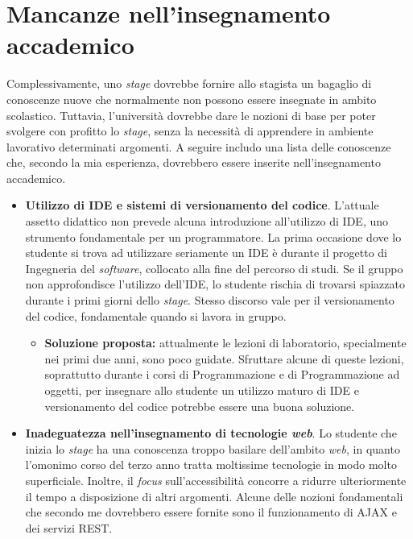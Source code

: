 \section{Mancanze nell'insegnamento accademico}
	Complessivamente, uno \textit{stage} dovrebbe fornire allo stagista un bagaglio di conoscenze nuove che normalmente non possono essere insegnate in ambito scolastico. Tuttavia, l'università dovrebbe dare le nozioni di base per poter svolgere con profitto lo \textit{stage}, senza la necessità di apprendere in ambiente lavorativo determinati argomenti. A seguire includo una lista delle conoscenze che, secondo la mia esperienza, dovrebbero essere inserite nell'insegnamento accademico.
	\begin{itemize}
		\item \textbf{Utilizzo di IDE e sistemi di versionamento del codice}. L'attuale assetto didattico non prevede alcuna introduzione all'utilizzo di IDE, uno strumento fondamentale per un programmatore. La prima occasione dove lo studente si trova ad utilizzare seriamente un IDE è durante il progetto di Ingegneria del \textit{software}, collocato alla fine del percorso di studi. Se il gruppo non approfondisce l'utilizzo dell'IDE, lo studente rischia di trovarsi spiazzato durante i primi giorni dello \textit{stage}. Stesso discorso vale per il versionamento del codice, fondamentale quando si lavora in gruppo.
			\begin{itemize}[leftmargin=*, labelsep=0pt, leftmargin=0pt]
				\item[] \textbf{Soluzione proposta:} attualmente le lezioni di laboratorio, specialmente nei primi due anni, sono poco guidate. Sfruttare alcune di queste lezioni, soprattutto durante i corsi di Programmazione e di Programmazione ad oggetti, per insegnare allo studente un utilizzo maturo di IDE e versionamento del codice potrebbe essere una buona soluzione.
			\end{itemize}
		\item \textbf{Inadeguatezza nell'insegnamento di tecnologie \textit{web}}. Lo studente che inizia lo \textit{stage} ha una conoscenza troppo basilare dell'ambito \textit{web}, in quanto l'omonimo corso del terzo anno tratta moltissime tecnologie in modo molto superficiale. Inoltre, il \textit{focus} sull'accessibilità concorre a ridurre ulteriormente il tempo a disposizione di altri argomenti. Alcune delle nozioni fondamentali che secondo me dovrebbero essere fornite sono il funzionamento di AJAX e dei servizi REST.
		\begin{itemize}[leftmargin=*, labelsep=0pt, leftmargin=0pt]

\end{itemize}
\end{itemize}

